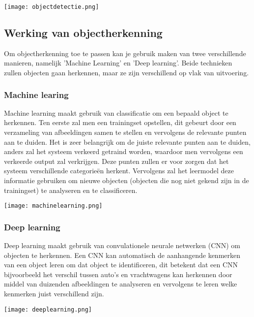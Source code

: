 \begin{center}
	\texttt{[image: objectdetectie.png]}
\end{center}

\subsection{Werking van objectherkenning}
Om objectherkenning toe te passen kan je gebruik maken van twee verschillende manieren, namelijk 'Machine Learning' en 'Deep learning'. Beide technieken zullen objecten gaan herkennen, maar ze zijn verschillend op vlak van uitvoering.

\subsubsection{Machine learing}
Machine learning maakt gebruik van classificatie om een bepaald object te herkennen. Ten eerste zal men een trainingset opstellen, dit gebeurt door een verzameling van afbeeldingen samen te stellen en vervolgens de relevante punten aan te duiden. Het is zeer belangrijk om de juiste relevante punten aan te duiden, anders zal het systeem verkeerd getraind worden, waardoor men vervolgens een verkeerde output zal verkrijgen. Deze punten zullen er voor zorgen dat het systeem verschillende categorieën herkent. Vervolgens zal het leermodel deze informatie gebruiken om nieuwe objecten (objecten die nog niet gekend zijn in de trainingset) te analyseren en te classificeren.

\begin{center}
	\texttt{[image: machinelearning.png]}
\end{center}

\subsubsection{Deep learning}
Deep learning maakt gebruik van convulationele neurale netwerken (CNN) om objecten te herkennen. Een CNN kan automatisch de aanhangende kenmerken van een object leren om dat object te identificeren, dit betekent dat een CNN bijvoorbeeld het verschil tussen auto's en vrachtwagens kan herkennen door middel van duizenden afbeeldingen te analyseren en vervolgens te leren welke kenmerken juist verschillend zijn.

\begin{center}
	\texttt{[image: deeplearning.png]}
\end{center}

